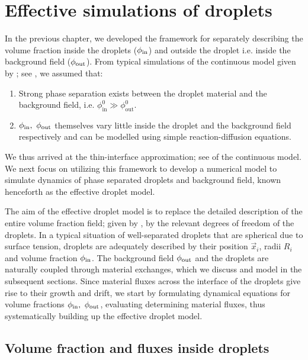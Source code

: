 \onehalfspacing

\chapter{Effective simulations of droplets}

\label{chap:Chapter_3}

In the previous chapter, we developed the framework for separately describing the volume fraction inside the droplets ($\phi_\mathrm{in}$) and outside the droplet i.e. inside the background field ($\phi_\mathrm{out}$).
From typical simulations of the continuous model given by ; see , we assumed that:
\begin{enumerate}
    \item Strong phase separation exists between the droplet material and the background field, i.e. $\phi^0_\mathrm{in} \gg \phi^0_\mathrm{out}$.

    \item $\phi_\mathrm{in},~\phi_\mathrm{out}$ themselves vary little inside the droplet and the background field respectively and can be modelled using simple reaction-diffusion equations.
\end{enumerate}
We thus arrived at the thin-interface approximation; see  of the continuous model.
We next focus on utilizing this framework to develop a numerical model to simulate dynamics of phase separated droplets and background field, known henceforth as the effective droplet model.

The aim of the effective droplet model is to replace the detailed description of the entire volume fraction field; given by , by the relevant degrees of freedom of the droplets.
In a typical situation of well-separated droplets that are spherical due to surface tension, droplets are adequately described by their position $\vec{x}_i$, radii $R_i$ and volume fraction $\phi_\mathrm{in}$.
The background field $\phi_\mathrm{out}$ and the droplets are naturally coupled through material exchanges, which we discuss and model in the subsequent sections.
Since material fluxes across the interface of the droplets give rise to their growth and drift, we start by formulating dynamical equations for volume fractions $\phi_\mathrm{in},~\phi_\mathrm{out}$, evaluating determining material fluxes, thus systematically building up the effective droplet model. 

\section{Volume fraction and fluxes inside droplets}

